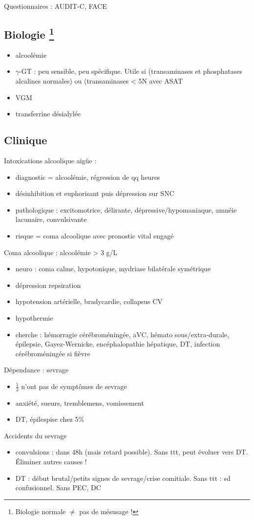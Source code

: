 \documentclass[11pt]{article}
\begin{document}
Questionnaires : AUDIT-C, FACE
\subsection{Biologie \footnote{Biologie normale \(\ne\) pas de mésusage !}}
\label{sec:org7563e8c}
\begin{itemize}
\item alcoolémie
\item \(\gamma\)-GT : peu sensible, peu spécifique. Utile si (transaminases et
phosphatases alcalines normales) ou (transaminases < 5N avec \inc{} ASAT
\item VGM
\item transferrine désialylée
\end{itemize}
\subsection{Clinique}
\label{sec:org6cb05d4}
Intoxications alcoolique aigüe : 
\begin{itemize}
\item diagnostic = alcoolémie, régression de qq heures
\item désinhibition et euphorisant puis dépression sur SNC
\item pathologique : excitomotrice, délirante, dépressive/hypomaniaque, amnéie
lacunaire, convulsivante
\item risque = coma alcoolique avec pronostic vital engagé
\end{itemize}
Coma alcoolique : alcoolémie > 3 g/L
\begin{itemize}
\item neuro : coma calme, hypotonique, mydriase bilatérale symétrique
\item dépression repsiration
\item hypotension artérielle, bradycardie, collapsus CV
\item hypothermie
\item \danger cherche : hémorragie cérébroméningée, aVC, hémato sous/extra-durale,
épilepsie, Gayez-Wernicke, encéphalopathie hépatique, \gls{DT}, infection
cérébroméningée si fièvre
\end{itemize}
Dépendance : sevrage
\begin{itemize}
\item \(\frac{1}{3}\) n'ont pas de symptômes de sevrage
\item anxiété, sueurs, tremblemens, vomissement
\item \gls{DT}, épilespise chez 5\%
\end{itemize}
Accidents du sevrage
\begin{itemize}
\item convulsions : dans 48h (mais retard possible). Sans ttt, peut évoluer vers
DT. Éliminer autres causes !
\item DT : début brutal/petits signes de sevrage/crise comitiale. Sans ttt : sd
confusionnel. Sans PEC, DC \faBomb
\end{itemize}
\end{document}
